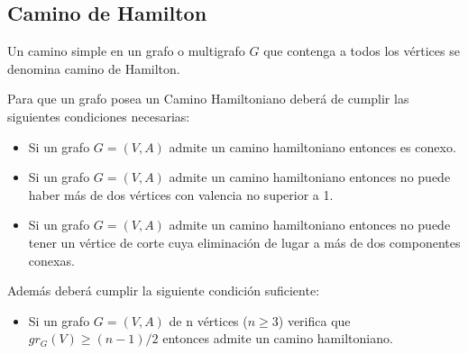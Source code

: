 \subsection{Camino de Hamilton}

\begin{fondo}
Un camino simple en un grafo o multigrafo $G$ que contenga a todos los vértices se denomina camino de Hamilton.
\end{fondo}

Para que un grafo posea un Camino Hamiltoniano deberá de cumplir las siguientes condiciones necesarias:\\
\begin{itemize}
\item Si un grafo $G = (V,A)$ admite un camino hamiltoniano entonces es conexo.
\item Si un grafo $G = (V,A)$ admite un camino hamiltoniano entonces no puede haber más de dos vértices con valencia no superior a 1.
\item Si un grafo $G = (V,A)$ admite un camino hamiltoniano entonces no puede tener un vértice de corte cuya eliminación de lugar a más de dos componentes conexas.
\end{itemize}

Además deberá cumplir la siguiente condición suficiente:\\
\begin{itemize}
\item Si un grafo $G = (V,A)$ de n vértices ($n \geq 3$) verifica que $gr_G(V) \geq (n-1)/2$ entonces admite un camino hamiltoniano.
\end{itemize}

